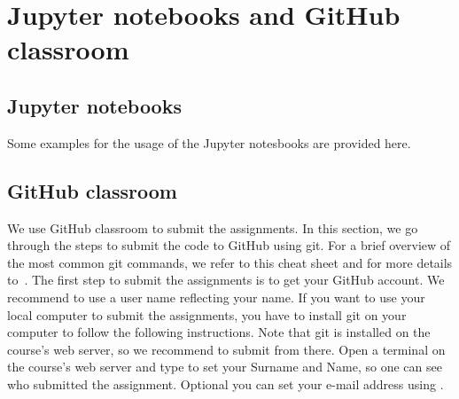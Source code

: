 \documentclass[11pt,fleqn]{book} %
\begin{document}
\chapter*{Jupyter notebooks and GitHub classroom}

\section*{Jupyter notebooks}

Some examples for the usage of the Jupyter notesbooks are provided here.

\section*{GitHub classroom}

We use GitHub classroom to submit the assignments. In this section, we go through the steps to submit the code to GitHub using git. For a brief overview of the most common git commands, we refer to this cheat sheet and for more details to~\cite{silverman2013git,laster2016professional}. The first step to submit the assignments is to get your GitHub account. We recommend to use a user name reflecting your name. If you want to use your local computer to submit the assignments, you have to install git on your computer to follow the following instructions. Note that git is installed on the course's web server, so we recommend to submit from there. Open a terminal on the course's web server and type  to set your Surname and Name, so one can see who submitted the assignment. Optional you can set your e-mail address using . \\
\end{document}
